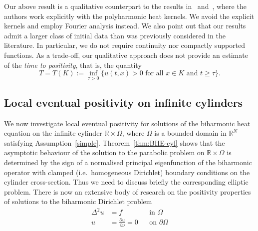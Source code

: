 \documentclass[a4paper, reqno]{amsart}
\numberwithin{equation}{section}
\theoremstyle{plain}
\theoremstyle{definition}
\theoremstyle{remark}
\newcommand{\RR}{\mathbb{R}}
\begin{document}
Our above result is a qualitative counterpart to the results in~\cite{GG-lep} and~\cite{FF-lep}, where the authors work explicitly with the polyharmonic heat kernels. We avoid the explicit kernels and employ Fourier analysis instead. We also point out that our results admit a larger class of initial data than was previously considered in the literature. In particular, we do not require continuity nor compactly supported functions. As a trade-off, our qualitative approach does not provide an estimate of the \emph{time to positivity}, that is, the quantity
\begin{equation*}
  T = T(K) := \inf_{\tau > 0} \{ u(t,x) > 0 \text{ for all } x \in K \text{ and } t \geq \tau \}.
\end{equation*}

\subsection{Local eventual positivity on infinite cylinders}
\label{sec:4}
We now investigate local eventual positivity for solutions of the biharmonic heat equation on the infinite cylinder $\RR \times \Omega$, where $\Omega$ is a bounded domain in $\RR^N$ satisfying Assumption~\ref{simple}. Theorem~\ref{thm:BHE-cyl} shows that the asymptotic behaviour of the solution to the parabolic problem on $\RR \times \Omega$ is determined by the sign of a normalised principal eigenfunction of the biharmonic operator with clamped (i.e.\ homogeneous Dirichlet) boundary conditions on the cylinder cross-section. Thus we need to discuss briefly the corresponding elliptic problem. There is now an extensive body of research on the positivity properties of solutions to the biharmonic Dirichlet problem
\begin{equation}
  \label{eq:BH-bvp2}
  \begin{aligned}
    \Delta^2 u & = f                                   &  & \text{in } \Omega         \\
    u          & = \frac{\partial u}{\partial \nu} = 0 &  & \text{on } \partial\Omega
  \end{aligned}
\end{equation}
\end{document}
